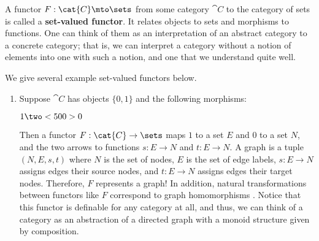 A functor $F : \cat{C} \mto \sets$ from some category $\cat{C}$ to the
category of sets is called a \textbf{set-valued functor}.  It relates
objects to sets and morphisms to functions.  One can think of them as
an interpretation of an abstract category to a concrete category; that
is, we can interpret a category without a notion of elements into one
with such a notion, and one that we understand quite well.

We give several example set-valued functors below.
\begin{enumerate}  
\item
  Suppose $\cat{C}$ has objects $\{0,1\}$ and the following
  morphisms:
  \begin{center}
    \begin{math}
      1 \two<500> 0
    \end{math}
  \end{center}
  Then a functor $F : \cat{C} \to \sets$ maps $1$ to a set $E$ and $0$
  to a set $N$, and the two arrows to functions $s : E \to N$ and $t :
  E \to N$.  A graph is a tuple $(N,E,s,t)$ where $N$ is the set of
  nodes, $E$ is the set of edge labels, $s : E \to N$ assigns edges
  their source nodes, and $t : E \to N$ assigns edges their target
  nodes.  Therefore, $F$ represents a graph!  In addition, natural
  transformations between functors like $F$ correspond to graph
  homomorphisms \cite{awodey2006category}.  Notice that this functor
  is definable for any category at all, and thus, we can think of a
  category as an abstraction of a directed graph with a monoid
  structure given by composition.


\end{enumerate}
